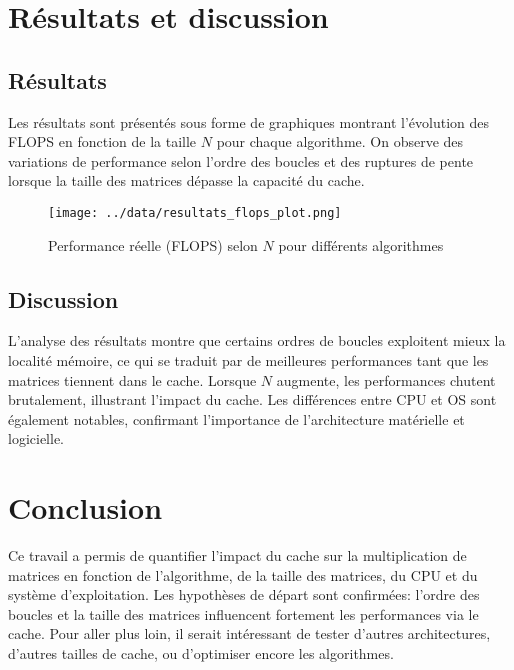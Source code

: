 \documentclass[a4paper,12pt]{article}
\begin{document}
\section{Résultats et discussion}

\subsection*{Résultats}
Les résultats sont présentés sous forme de graphiques montrant l'évolution des FLOPS en fonction de la taille \(N\) pour chaque algorithme. On observe des variations de performance selon l'ordre des boucles et des ruptures de pente lorsque la taille des matrices dépasse la capacité du cache.

\begin{figure}[h]
    \centering
    \texttt{[image: ../data/resultats\_flops\_plot.png]}
    \caption{Performance réelle (FLOPS) selon \(N\) pour différents algorithmes}
\end{figure}

\subsection*{Discussion}
L'analyse des résultats montre que certains ordres de boucles exploitent mieux la localité mémoire, ce qui se traduit par de meilleures performances tant que les matrices tiennent dans le cache. Lorsque \(N\) augmente, les performances chutent brutalement, illustrant l'impact du cache. Les différences entre CPU et OS sont également notables, confirmant l'importance de l'architecture matérielle et logicielle.

\section{Conclusion}

Ce travail a permis de quantifier l'impact du cache sur la multiplication de matrices
en fonction de l'algorithme, de la taille des matrices, du CPU et du système d'exploitation. 
Les hypothèses de départ sont confirmées: l'ordre des boucles et la taille des matrices 
influencent fortement les performances via le cache. Pour aller plus loin, 
il serait intéressant de tester d'autres architectures, d'autres tailles de cache, 
ou d'optimiser encore les algorithmes.
\end{document}
